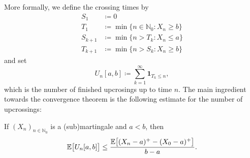 More formally, we define the crossing times by
\begin{align*}
	S_1 &\coloneqq 0 \\
		T_1 &\coloneqq \min\lbrace n\in \mathbb{N}_0: X_n \geq b \rbrace \\
	S_{k+1} &\coloneqq \min\lbrace n > T_k: X_n \leq a \rbrace \\
	T_{k+1} &\coloneqq \min\lbrace n > S_k: X_n \geq b \rbrace
\end{align*}
and set $$U_n[a,b]\coloneqq \sum\limits_{k=1}^{\infty}\mathbf 1_{T_k \leq n},$$ which is the number of finished upcrosings up to time $n$. The main ingredient towards the convergence theorem is the following estimate for the number of upcrossings:
\begin{llemma}
\begin{lemma}\label{upcrossing_inequality}
	If $(X_n)_{n\in\mathbb{N}_0}$ is a (sub)martingale and $a<b$, then $$ \mathbb{E}\big[ U_n[a,b]\big] \leq \frac{\mathbb{E}\big[ (X_n-a)^+ - (X_0-a)^+ \big]}{b-a}.$$
\end{lemma}
\end{llemma}
